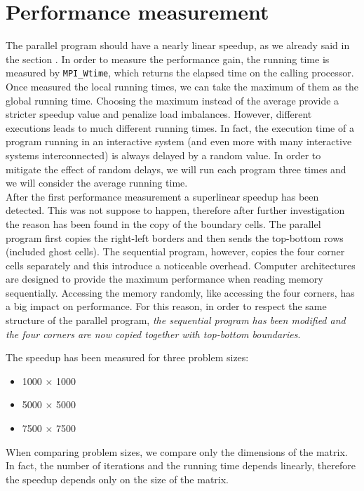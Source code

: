 \documentclass{article}
\begin{document}
\section{Performance measurement}
The parallel program should have a nearly linear speedup, as we already said in the section . In order to measure the performance gain, the running time is measured by \texttt{MPI\_Wtime}, which returns the elapsed time on the calling processor. Once measured the local running times, we can take the maximum of them as the global running time. Choosing the maximum instead of the average provide a stricter speedup value and penalize load imbalances. However, different executions leads to much different running times. In fact, the execution time of a program running in an interactive system (and even more with many interactive systems interconnected) is always delayed by a random value. In order to mitigate the effect of random delays, we will run each program three times and we will consider the average running time. \\
After the first performance measurement a superlinear speedup has been detected. This was not suppose to happen, therefore after further investigation the reason has been found in the copy of the boundary cells. The parallel program first copies the right-left borders and then sends the top-bottom rows (included ghost cells). The sequential program, however, copies the four corner cells separately and this introduce a noticeable overhead. Computer architectures are designed to provide the maximum performance when reading memory sequentially. Accessing the memory randomly, like accessing the four corners, has a big impact on performance. For this reason, in order to respect the same structure of the parallel program, \emph{the sequential program has been modified and the four corners are now copied together with top-bottom boundaries}.

The speedup has been measured for three problem sizes:
\begin{itemize}
    \item 1000 $\times$ 1000
    \item 5000 $\times$ 5000
    \item 7500 $\times$ 7500
\end{itemize}
When comparing problem sizes, we compare only the dimensions of the matrix. In fact, the number of iterations and the running time depends linearly, therefore the speedup depends only on the size of the matrix.
\end{document}
